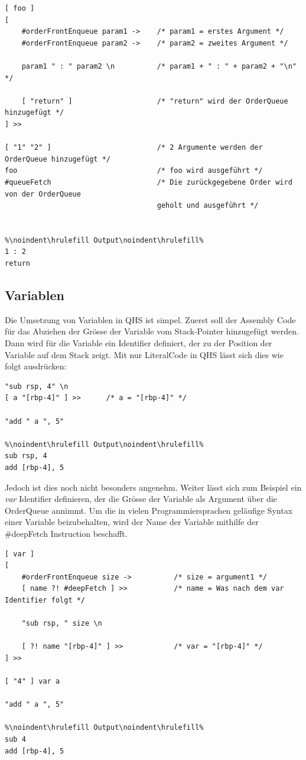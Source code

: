 \begin{lstlisting}[language=QHS, caption=Parameter und Rückgabewert eines Identifiers]
[ foo ]
[
    #orderFrontEnqueue param1 ->    /* param1 = erstes Argument */
    #orderFrontEnqueue param2 ->    /* param2 = zweites Argument */

    param1 " : " param2 \n          /* param1 + " : " + param2 + "\n" */

    [ "return" ]                    /* "return" wird der OrderQueue hinzugefügt */
] >>

[ "1" "2" ]                         /* 2 Argumente werden der OrderQueue hinzugefügt */
foo                                 /* foo wird ausgeführt */
#queueFetch                         /* Die zurückgegebene Order wird von der OrderQueue
                                    geholt und ausgeführt */


%\noindent\hrulefill Output\noindent\hrulefill%
1 : 2
return
\end{lstlisting}


\subsection{Variablen} \label{sec:qhs-vars}
Die Umsetzung von Variablen in QHS ist simpel. Zuerst soll der Assembly Code für das Abziehen der Grösse der Variable vom Stack-Pointer hinzugefügt werden.
Dann wird für die Variable ein Identifier definiert, der zu der Position der Variable auf dem Stack zeigt.
Mit nur LiteralCode in QHS lässt sich dies wie folgt ausdrücken:

\begin{lstlisting}[language=QHS, caption=Definition einer Variable mit viel LiteralCode]
"sub rsp, 4" \n
[ a "[rbp-4]" ] >>      /* a = "[rbp-4]" */

"add " a ", 5"

%\noindent\hrulefill Output\noindent\hrulefill%
sub rsp, 4
add [rbp-4], 5
\end{lstlisting}

Jedoch ist dies noch nicht besonders angenehm. Weiter lässt sich zum Beispiel ein \textit{var} Identifier definieren, der die Grösse der Variable als Argument über die OrderQueue annimmt. Um die in vielen Programmiersprachen geläufige Syntax
einer Variable beizubehalten, wird der Name der Variable mithilfe der \#deepFetch Instruction beschafft.

\begin{lstlisting}[language=QHS, caption=Definition einer Variable mit \textit{var} Identifier]
[ var ]
[
    #orderFrontEnqueue size ->          /* size = argument1 */
    [ name ?! #deepFetch ] >>           /* name = Was nach dem var Identifier folgt */

    "sub rsp, " size \n

    [ ?! name "[rbp-4]" ] >>            /* var = "[rbp-4]" */
] >> 

[ "4" ] var a 

"add " a ", 5"
    
%\noindent\hrulefill Output\noindent\hrulefill%
sub 4
add [rbp-4], 5
\end{lstlisting}

